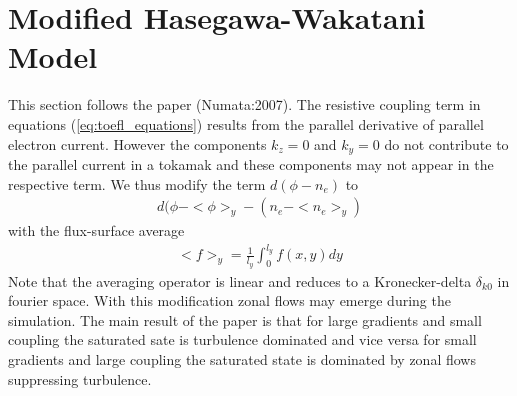 \documentclass[a4paper,12pt]{scrartcl}
\begin{document}
\section{ Modified Hasegawa-Wakatani Model}
\label{seq:modified}
This section follows the paper (Numata:2007). The resistive coupling term
in equations (\ref{eq:toefl_equations}) results from the parallel 
derivative of parallel electron current. However the components 
$k_z=0$ and $k_y=0$ do not contribute to the parallel current in a tokamak
and 
these components may not appear in the respective term. 
We thus modify the term $d(\phi - n_e)$ to 
\begin{align}
d(\phi - <\phi>_y - (n_e - <n_e>_y)
\end{align}
with the flux-surface average
\begin{align}
 <f>_y = \frac{1}{l_y}\int_0^{l_y}f(x,y)dy
\end{align}
Note that the averaging operator is linear and reduces to a Kronecker-delta
 $\delta_{k0}$ in fourier space. With this modification zonal flows 
 may emerge during the simulation.
 The main result of the paper is that for large gradients and 
 small coupling the saturated sate is turbulence dominated and 
 vice versa for small gradients and large coupling the saturated state 
 is dominated by zonal flows suppressing turbulence.






\end{document}
